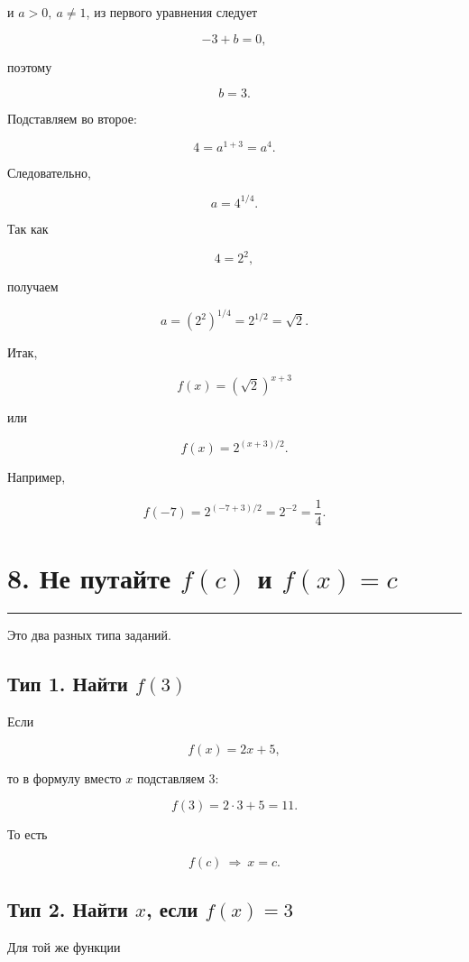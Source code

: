 \documentclass[a4paper,12pt]{article}
\newcommand{\sectionline}{%
    \vspace{0.2em}
    {\color{accent}\rule{\linewidth}{0.7pt}}
    \vspace{0.45em}
}
\begin{document}
и \(a>0,\ a\ne1\), из первого уравнения следует

\[
-3+b=0,
\]

поэтому

\[
b=3.
\]

Подставляем во второе:

\[
4=a^{1+3}=a^4.
\]

Следовательно,

\[
a=4^{1/4}.
\]

Так как

\[
4=2^2,
\]

получаем

\[
a=(2^2)^{1/4}=2^{1/2}=\sqrt2.
\]

Итак,

\[
\boxed{f(x)=\left(\sqrt2\right)^{x+3}}
\]

или

\[
\boxed{f(x)=2^{(x+3)/2}}.
\]

Например,

\[
f(-7)
=
2^{(-7+3)/2}
=
2^{-2}
=
\frac14.
\]


\section*{\textcolor{darkaccent}{8. Не путайте \(f(c)\) и \(f(x)=c\)}}

\sectionline

Это два разных типа заданий.

\subsection*{\textcolor{accent}{Тип 1. Найти \(f(3)\)}}

Если

\[
f(x)=2x+5,
\]

то в формулу вместо \(x\) подставляем \(3\):

\[
f(3)=2\cdot3+5=11.
\]

То есть

\[
\boxed{f(c)\ \Rightarrow\ x=c.}
\]

\subsection*{\textcolor{accent}{Тип 2. Найти \(x\), если \(f(x)=3\)}}

Для той же функции
\end{document}
